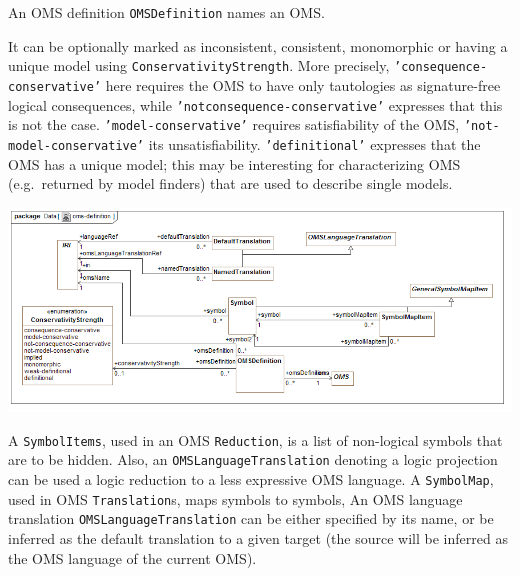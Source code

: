 \documentclass[10pt,fleqn,final]{scrreprt}
\makeatletter
\newcommand{\cbs}[0]{\color{red}\xspace} %
\newcommand{\cbe}[0]{\color{black}\xspace} %
\newcommand*\CommentAuthor{}
\renewcommand*\CommentAuthor{#1}}
\newcommand*\CommentDate{}
\renewcommand*\CommentDate{#1}}
\newcommand*\CommentId{}
\renewcommand*\CommentId{#1}}
\newcommand*\CommentType{}
\renewcommand*\CommentType{#1}}
\newcommand*{\SetCommentColorByType}[1]{%
\edef\localType{{#1}}%
\expandafter\ifstrequal\localType{q-aut}{\colorlet{CommentColor}{red}}{%
\expandafter\ifstrequal\localType{q-all}{\colorlet{CommentColor}{orange}}{%
\expandafter\ifstrequal\localType{todo}{\colorlet{CommentColor}{orange}}{%
\expandafter\ifstrequal\localType{fyi}{\colorlet{CommentColor}{lightgray}}{%
\colorlet{CommentColor}{yellow}}}}}}
\newcommand*{\SetCommentPrefixByType}[1]{%
\edef\localType{{#1}}%
\expandafter\@ifmtarg\localType{%
\edef\CommentPrefix{}%
}{%
\caseupper[q]{#1}%
\edef\CommentPrefix{\thestring: }%
}}
\newcommand*{\initComment}[1]{%
\setkeys{Comment}{#1}%
\SetCommentColorByType{\CommentType}%
\relax%
\SetCommentPrefixByType{\CommentType}%
\relax%
}
\newcommand*{\todonote}[2][]{%
\initComment{#1}%
\pdfcomment[author=\CommentAuthor,color=CommentColor,date=\CommentDate,id=\CommentId]{%
\CommentPrefix
#2}}
\renewcommand*{\todonote}[2][]{%
\initComment{#1}%
\ednote{\CommentPrefix #2}}
\newcommand*{\CLnote}[2][author=Christoph Lange]{%
\todonote[author=Christoph Lange,#1]{#2} 
}
\newcommand*{\termref}[1]{\index{#1}#1\xspace}
\newcommand*{\syntax}[1]{\texttt{#1}}
\newenvironment{definitions}[0]{\medskip }{}
\makeatother
\begin{document}
\begin{definitions}
\begin{center}
\end{center}

An OMS definition \syntax{OMSDefinition} names an  OMS.  

It can be
optionally marked as inconsistent, consistent, monomorphic or having a unique model using 
\syntax{ConservativityStrength}. More precisely, \syntax{'consequence-conservative'}
here requires the OMS to have only tautologies as signature-free logical consequences, while \syntax{'not\-consequence-conservative'} expresses that this is not the case. 
\syntax{'model-conservative'}
requires satisfiability of the OMS, \syntax{'not-model-conservative'} its
unsatisfiability.
\syntax{'de\-fi\-nitional'} expresses \cbs that the OMS has a unique model\cbe; this may be interesting for characterizing
OMS (e.g.\ returned by model finders) that are used to describe single models. 

\medskip
\includegraphics[width=\textwidth]{mof/Class_Diagram__oms-definition.png}

A
\syntax{SymbolItems}, used in an OMS \syntax{Reduction}, is a
list of non-logical symbols that are to be hidden. Also,
an \syntax{OMSLanguageTranslation} denoting a logic projection
can be used a logic reduction to a
less expressive OMS language. A \syntax{SymbolMap}, used in
OMS \syntax{Translation}s,  maps symbols to symbols,
An OMS language translation \syntax{OMSLanguageTranslation} 
can be either specified by its name, or be inferred as the \termref{default
translation} to a given target (the source will be inferred as the 
OMS language of the current OMS).




\end{definitions}
\end{document}

